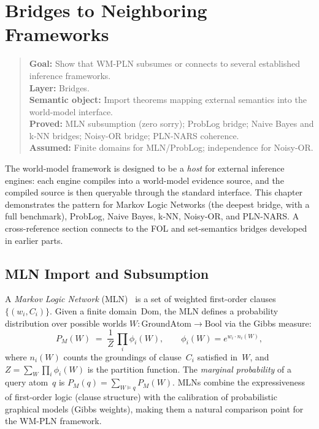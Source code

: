 \documentclass[11pt,openany]{report}
\begin{document}
\chapter{Bridges to Neighboring Frameworks}
\label{ch:bridges}

\begin{quote}\small
\textbf{Goal:} Show that WM-PLN subsumes or connects to several established inference frameworks.\\
\textbf{Layer:} Bridges.\\
\textbf{Semantic object:} Import theorems mapping external semantics into the world-model interface.\\
\textbf{Proved:} MLN subsumption (zero sorry); ProbLog bridge; Naive Bayes and k-NN bridges; Noisy-OR bridge; PLN-NARS coherence.\\
\textbf{Assumed:} Finite domains for MLN/ProbLog; independence for Noisy-OR.
\end{quote}

The world-model framework is designed to be a \emph{host} for external
inference engines: each engine compiles into a world-model evidence
source, and the compiled source is then queryable through the standard
interface.  This chapter demonstrates the pattern for Markov Logic
Networks (the deepest bridge, with a full benchmark), ProbLog, Naive
Bayes, k-NN, Noisy-OR, and PLN-NARS.  A cross-reference section
connects to the FOL and set-semantics bridges developed in earlier
parts.
\section{MLN Import and Subsumption}
\label{sec:mln-subsumption}

A \emph{Markov Logic Network}
(MLN)~\cite{richardson2006markov} is a set of weighted first-order
clauses $\{(w_i, C_i)\}$.  Given a finite domain~$\mathrm{Dom}$, the
MLN defines a probability distribution over possible worlds
$W : \mathrm{GroundAtom} \to \mathrm{Bool}$ via the Gibbs measure:
\[
  P_M(W) \;=\; \frac{1}{Z}\,\prod_i \phi_i(W),
  \qquad
  \phi_i(W) = e^{w_i \cdot n_i(W)},
\]
where $n_i(W)$ counts the groundings of clause~$C_i$ satisfied in~$W$,
and $Z = \sum_W \prod_i \phi_i(W)$ is the partition function.  The
\emph{marginal probability} of a query atom~$q$ is
$P_M(q) = \sum_{W \models q} P_M(W)$.  MLNs combine the expressiveness
of first-order logic (clause structure) with the calibration of
probabilistic graphical models (Gibbs weights), making them a natural
comparison point for the WM-PLN framework.
\end{document}
